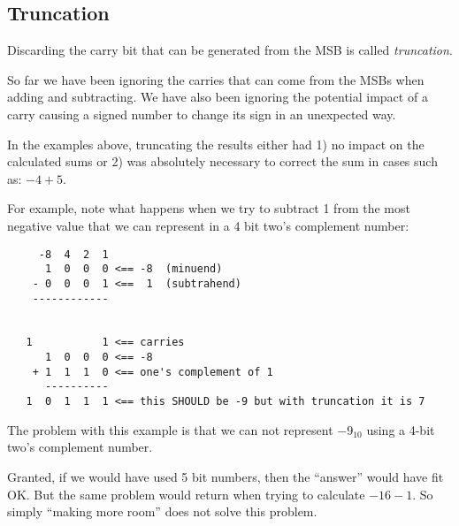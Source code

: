 %
%
%



\subsection{Truncation}

Discarding the carry bit that can be generated from the MSB is called {\em truncation}.

So far we have been ignoring the carries that can come from the MSBs when adding and subtracting.  
We have also been ignoring the potential impact of a carry causing a signed number to change 
its sign in an unexpected way.

In the examples above, truncating the results either had 1) no impact on the calculated sums
or 2) was absolutely necessary to correct the sum in cases such as: $-4 + 5$.

For example, note what happens when we try to subtract 1 from the most 
negative value that we can represent in a 4 bit two's complement number:

\begin{verbatim}
     -8  4  2  1
      1  0  0  0 <== -8  (minuend)
    - 0  0  0  1 <==  1  (subtrahend)
    ------------


   1           1 <== carries
      1  0  0  0 <== -8
    + 1  1  1  0 <== one's complement of 1
      ----------
   1  0  1  1  1 <== this SHOULD be -9 but with truncation it is 7 
\end{verbatim}

The problem with this example is that we can not represent $-9_{10}$ using a 4-bit 
two's complement number.  

Granted, if we would have used 5 bit numbers, then the ``answer'' would have fit OK.
But the same problem would return when trying to calculate $-16 - 1$. 
So simply ``making more room'' does not solve this problem.

